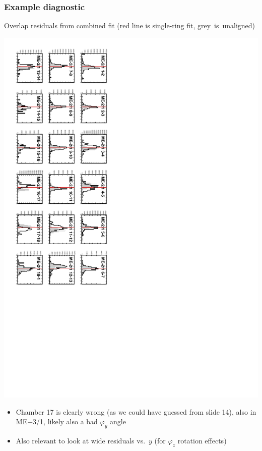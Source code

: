 \documentclass[compress]{beamer}
\begin{document}
\begin{frame}
\frametitle{Example diagnostic}
\small

\hspace{-0.5 cm} Overlap residuals from combined fit (red line is single-ring fit, \mbox{grey is unaligned)\hspace{-1 cm}}

\vfill
\includegraphics[height=\linewidth, angle=90]{final_checkresids_half.pdf}

\vfill
\begin{itemize}
\item Chamber 17 is clearly wrong (as we could have guessed from slide 14), also in ME$-$3/1, likely also a bad $\varphi_y$ angle
\item Also relevant to look at wide residuals vs.\ $y$ (for $\varphi_z$ rotation effects)
\end{itemize}
\end{frame}
\end{document}

